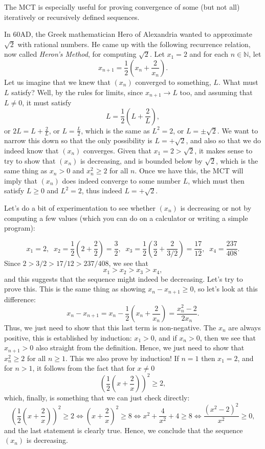 \documentclass[11pt,dvipsnames]{book}
\numberwithin{equation}{section} %
\numberwithin{figure}{section} %
\numberwithin{table}{section} %
\begin{document}
The MCT is especially useful for proving convergence of some (but not all) iteratively or recursively defined sequences.
\begin{example}
In 60AD, the Greek mathematician Hero of Alexandria wanted to approximate $\sqrt{2}$ with rational numbers. %
He came up with the following recurrence relation, now called {\it Heron's Method}, for computing $\sqrt{2}$. Let $x_{1}=2$ and for each $n\in\mathbb{N}$, let
\[
x_{n+1}=\frac{1}{2}\left(x_{n}+\frac{2}{x_{n}}\right).
\]
Let us imagine that we knew that $(x_n)$ converged to something, $L$. What must $L$ satisfy? Well, by the rules for limits, since $x_{n+1} \to L$ too, and assuming that $L \neq 0$, it must satisfy 
\[
L=\frac{1}{2}\left(L+\frac{2}{L}\right),
\]
or $2L =L + \frac{2}{L}$, or $L = \frac{L}{2}$, which is the same as $L^2 = 2$, or $L = \pm\sqrt{2}$. We want to narrow this down so that the only possibility is $L = + \sqrt{2}$, and also so that we do indeed know that $(x_n)$ converges. Given that $x_1 = 2 > \sqrt{2}$, it makes sense to try to show that $(x_n)$ is decreasing, and is bounded below by $\sqrt{2}$, which is the same thing as $x_n > 0$ and $x_n^2 \geq 2$ for all $n$. Once we have this, the MCT will imply that $(x_n)$ does indeed converge to some number $L$, which must then satisfy $L \geq 0$ and $L^2 = 2$, thus indeed $L = + \sqrt{2}$.

Let's do a bit of experimentation to see whether $(x_n)$ is decreasing or not by computing a few values (which you can do on a calculator or writing a simple program):

\[
x_{1}=2,\;\; x_{2} = \frac{1}{2}\left(2+\frac{2}{2}\right) = \frac{3}{2}, \;\; x_{3}=\frac{1}{2}\left(\frac{3}{2}+\frac{2}{3/2}\right) = \frac{17}{12}, \;\; x_{4} = \frac{237}{408}.
\]
Since $ 2 > 3/2 > 17/12 > 237/408$, we see that 
\[ x_1 > x_2 > x_3 > x_4, \]
and this suggests that the sequence might indeed be decreasing. Let's try to prove this.
This is the same thing as showing $x_{n}-x_{n+1}\geq 0$, so let's look at this difference:
\[
x_{n}-x_{n+1}=x_{n}-\frac{1}{2}\left(x_{n}+\frac{2}{x_{n}}\right) =\frac{x_{n}^{2}-2}{2x_{n}}.
\]
Thus, we just need to show that this last term is non-negative. The $x_{n}$ are always positive, this is established by induction: $x_1>0$, and if $x_n>0$, then we see that $x_{n+1}>0$ also straight from the definition. Hence, we just need to show that $x_{n}^{2}\geq 2$ for all $n\geq 1$. This we also prove by induction! If $n=1$ then $x_{1}=2$, and for $n>1$, it follows from the fact that for $x \neq 0$ 
\[ 
\left(\frac{1}{2}\left(x+\frac{2}{x}\right)\right)^2 \geq 2,
\]
which, finally, is something that we can just check directly:
\[ 
\left(\frac{1}{2}\left(x+\frac{2}{x}\right)\right)^2 \geq 2 \iff \left(x+\frac{2}{x}\right)^2 \geq 8 \iff x^2 + \frac{4}{x^2} + 4 \geq 8 \iff \frac{(x^2 - 2)^2}{x^2} \geq 0,
\] 
and the last statement is clearly true. Hence, we conclude that the sequence $(x_n)$ is decreasing. 


\end{example}
\end{document}
